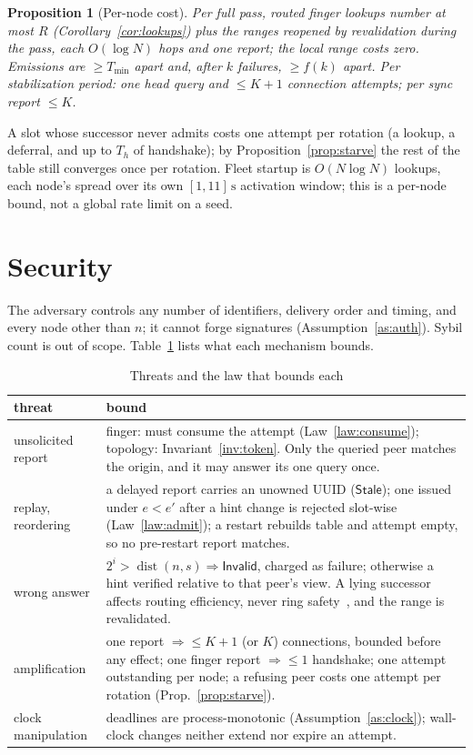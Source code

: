 \documentclass[journal]{IEEEtran}
\newtheorem{proposition}{Proposition}
\newcommand{\dist}{\operatorname{dist}}
\newcommand{\Stale}{\mathsf{Stale}}
\newcommand{\Invalid}{\mathsf{Invalid}}
\begin{document}
\begin{proposition}[Per-node cost]\label{prop:cost}
Per full pass, routed finger lookups number at most $R$
(Corollary~\ref{cor:lookups}) plus the ranges reopened by revalidation
during the pass, each $O(\log N)$ hops and one report; the local range
costs zero.  Emissions are $\ge T_{\min}$ apart and, after $k$ failures,
$\ge f(k)$ apart.  Per stabilization period: one head query and $\le K{+}1$
connection attempts; per sync report $\le K$.
\end{proposition}

A slot whose successor never admits costs one attempt per rotation (a
lookup, a deferral, and up to $T_h$ of handshake); by
Proposition~\ref{prop:starve} the rest of the table still converges once
per rotation.  Fleet startup is $O(N\log N)$ lookups, each node's spread
over its own $[1,11]\,\mathrm{s}$ activation window; this is a per-node
bound, not a global rate limit on a seed.

\section{Security}\label{sec:security}

The adversary controls any number of identifiers, delivery order and
timing, and every node other than $n$; it cannot forge signatures
(Assumption~\ref{as:auth}).  Sybil count is out of scope.
Table~\ref{tab:threats} lists what each mechanism bounds.

\begin{table}[t]
\caption{Threats and the law that bounds each}
\label{tab:threats}
\centering\small
\begin{tabular}{@{}>{\raggedright\arraybackslash}p{}>{\raggedright\arraybackslash}p{}@{}}
\toprule
threat & bound \\
\midrule
unsolicited report & finger: must consume the attempt (Law~\ref{law:consume}); topology: Invariant~\ref{inv:token}.  Only the queried peer matches the origin, and it may answer its one query once. \\
replay, reordering & a delayed report carries an unowned UUID ($\Stale$); one issued under $e<e'$ after a hint change is rejected slot-wise (Law~\ref{law:admit}); a restart rebuilds table and attempt empty, so no pre-restart report matches. \\
wrong answer & $2^{i}>\dist(n,s)\Rightarrow\Invalid$, charged as failure; otherwise a hint verified relative to that peer's view.  A lying successor affects routing efficiency, never ring safety~\cite{Zave2017}, and the range is revalidated. \\
amplification & one report $\Rightarrow\le K{+}1$ (or $K$) connections, bounded before any effect; one finger report $\Rightarrow\le1$ handshake; one attempt outstanding per node; a refusing peer costs one attempt per rotation (Prop.~\ref{prop:starve}). \\
clock manipulation & deadlines are process-monotonic (Assumption~\ref{as:clock}); wall-clock changes neither extend nor expire an attempt. \\
\bottomrule
\end{tabular}
\end{table}
\end{document}
